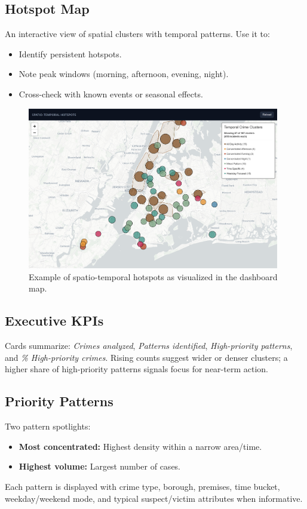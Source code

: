 \documentclass[11pt]{article}
\begin{document}
\subsection{Hotspot Map}
An interactive view of spatial clusters with temporal patterns. Use it to:
\begin{itemize}[leftmargin=*]
  \item Identify persistent hotspots.
  \item Note peak windows (morning, afternoon, evening, night).
  \item Cross-check with known events or seasonal effects.
\end{itemize}

\begin{figure}[H]
  \centering
  \includegraphics[width=0.98\textwidth]{spatio-temporal_clusters.png}
  \caption{Example of spatio-temporal hotspots as visualized in the dashboard map.}
\end{figure}

\subsection{Executive KPIs}
Cards summarize: \emph{Crimes analyzed}, \emph{Patterns identified}, \emph{High-priority patterns}, and \emph{\% High-priority crimes}. Rising counts suggest wider or denser clusters; a higher share of high-priority patterns signals focus for near-term action.

\subsection{Priority Patterns}
Two pattern spotlights:
\begin{itemize}[leftmargin=*]
  \item \textbf{Most concentrated:} Highest density within a narrow area/time.
  \item \textbf{Highest volume:} Largest number of cases.
\end{itemize}
Each pattern is displayed with crime type, borough, premises, time bucket, weekday/weekend mode, and typical suspect/victim attributes when informative.
\end{document}
